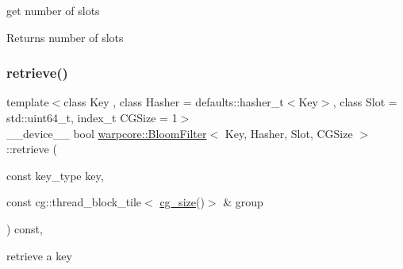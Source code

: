 get number of slots 

\begin{DoxyReturn}{Returns}
number of slots 
\end{DoxyReturn}
\mbox{\label{classwarpcore_1_1BloomFilter_ad2621ee746d6a2ba6a0bed2ca3946aaa}} 
\subsubsection{\texorpdfstring{retrieve()}{retrieve()}\hspace{0.1cm}{\footnotesize\ttfamily [1/2]}}
{\footnotesize\ttfamily template$<$class Key , class Hasher  = defaults\+::hasher\+\_\+t$<$\+Key$>$, class Slot  = std\+::uint64\+\_\+t, index\+\_\+t C\+G\+Size = 1$>$ \\
\+\_\+\+\_\+device\+\_\+\+\_\+ bool \hyperlink{classwarpcore_1_1BloomFilter}{warpcore\+::\+Bloom\+Filter}$<$ Key, Hasher, Slot, C\+G\+Size $>$\+::retrieve (\begin{DoxyParamCaption}\item[{const key\+\_\+type}]{key,  }\item[{const cg\+::thread\+\_\+block\+\_\+tile$<$ \hyperlink{classwarpcore_1_1BloomFilter_a6ad2335811852ad62fc65e85416d3904}{cg\+\_\+size}()$>$ \&}]{group }\end{DoxyParamCaption}) const\hspace{0.3cm}{\ttfamily [inline]}, {\ttfamily [noexcept]}}



retrieve a key 


